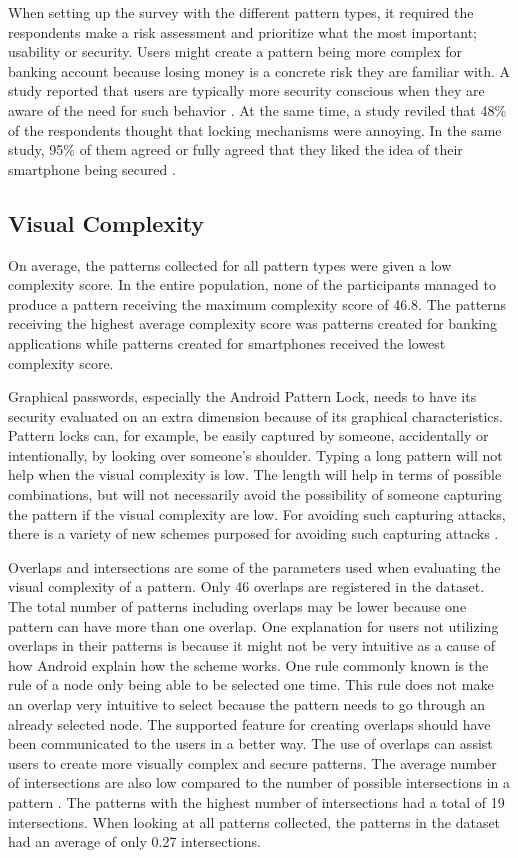       When setting up the survey with the different pattern types, it required the respondents make a risk assessment and prioritize what the most important; usability or security. Users might create a pattern being more complex for banking account because losing money is a concrete risk they are familiar with. A study reported that users are typically more security conscious when they are aware of the need for such behavior \cite{Sasse}. At the same time, a study reviled that 48\% of the respondents thought that locking mechanisms were annoying. In the same study, 95\% of them agreed or fully agreed that they liked the idea of their smartphone being secured \cite{habits3}.

    \subsection{Visual Complexity}
      On average, the patterns collected for all pattern types were given a low complexity score. In the entire population, none of the participants managed to produce a pattern receiving the maximum complexity score of 46.8. The patterns receiving the highest average complexity score was patterns created for banking applications while patterns created for smartphones received the lowest complexity score. 

      Graphical passwords, especially the Android Pattern Lock, needs to have its security evaluated on an extra dimension because of its graphical characteristics. Pattern locks can, for example, be easily captured by someone, accidentally or intentionally, by looking over someone's shoulder. Typing a long pattern will not help when the visual complexity is low. The length will help in terms of possible combinations, but will not necessarily avoid the possibility of someone capturing the pattern if the visual complexity are low.  For avoiding such capturing attacks, there is a variety of new schemes purposed for avoiding such capturing attacks \cite{Wiedenbeck, IPAS}. 

      Overlaps and intersections are some of the parameters used when evaluating the visual complexity of a pattern. Only 46 overlaps are registered in the dataset. The total number of patterns including overlaps may be lower because one pattern can have more than one overlap. One explanation for users not utilizing overlaps in their patterns is because it might not be very intuitive as a cause of how Android explain how the scheme works. One rule commonly known is the rule of a node only being able to be selected one time. This rule does not make an overlap very intuitive to select because the pattern needs to go through an already selected node. The supported feature for creating overlaps should have been communicated to the users in a better way. The use of overlaps can assist users to create more visually complex and secure patterns. The average number of intersections are also low compared to the number of possible intersections in a pattern \cite{Sun}. The patterns with the highest number of intersections had a total of 19 intersections. When looking at all patterns collected, the patterns in the dataset had an average of only 0.27 intersections. 

